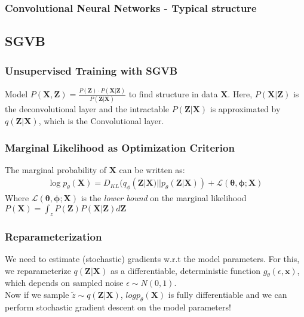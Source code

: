 \documentclass{beamer}
\begin{document}
\begin{frame}
\frametitle{Convolutional Neural Networks - Typical structure}

\end{frame}

\subsection{SGVB}
\begin{frame}
\frametitle{Unsupervised Training with SGVB}
Model $P(\mathbf{X},\mathbf{Z}) = \frac{P(\mathbf{Z})\cdot P(\mathbf{X}|\mathbf{Z})}{P(\mathbf{Z}|\mathbf{X})}$ to find structure in data $\mathbf{X}$. \vspace{0.5mm}
Here, $P(\mathbf{X}|\mathbf{Z})$ is the deconvolutional layer and the intractable $P(\mathbf{Z}|\mathbf{X})$ is approximated by $q(\mathbf{Z}|\mathbf{X})$, which is the Convolutional layer.
\end{frame}

\begin{frame}
\frametitle{Marginal Likelihood as Optimization Criterion}
The marginal probability of $\mathbf{X}$ can be written as:
\begin{align*}
\log p_\theta(\mathbf{X}) = D_{KL}(q_\phi(\mathbf{Z}|\mathbf{X}) || p_\theta(\mathbf{Z}|\mathbf{X})) + \mathcal{L}(\mathbf{\theta}, \mathbf{\phi}; \mathbf{X})
\end{align*}
Where 
$\mathcal{L}(\mathbf{\theta}, \mathbf{\phi}; \mathbf{X})$
is the \textit{lower bound} on the marginal likelihood
$
P(\mathbf{X}) = \int_z P(\mathbf{Z})P(\mathbf{X}|\mathbf{Z})d\mathbf{Z}$
\end{frame}

\begin{frame}
\frametitle{Reparameterization}
We need to estimate (stochastic) gradients w.r.t the model parameters. For this, we reparameterize $q(\mathbf{Z}|\mathbf{X})$ as a differentiable, deterministic function $g_{\theta}(\epsilon,\mathbf{x})$, which depends on sampled noise $\epsilon \sim N(0,1)$. \\ Now if we sample $\tilde{z} \sim q(\mathbf{Z}|\mathbf{X})$, $logp_{\theta}(\mathbf{X})$ is fully differentiable and we can perform stochastic gradient descent on the model parameters!
\end{frame}
\end{document}
